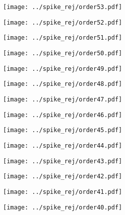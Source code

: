 \documentclass{article}
\begin{document}
\begin{figure}[H]
    \centering
    \texttt{[image: ../spike\_rej/order53.pdf]}
\end{figure}
\begin{figure}[H]
    \centering
    \texttt{[image: ../spike\_rej/order52.pdf]}
\end{figure}
\begin{figure}[H]
    \centering
    \texttt{[image: ../spike\_rej/order51.pdf]}
\end{figure}
\begin{figure}[H]
    \centering
    \texttt{[image: ../spike\_rej/order50.pdf]}
\end{figure}
\begin{figure}[H]
    \centering
    \texttt{[image: ../spike\_rej/order49.pdf]}
\end{figure}
\begin{figure}[H]
    \centering
    \texttt{[image: ../spike\_rej/order48.pdf]}
\end{figure}
\begin{figure}[H]
    \centering
    \texttt{[image: ../spike\_rej/order47.pdf]}
\end{figure}
\begin{figure}[H]
    \centering
    \texttt{[image: ../spike\_rej/order46.pdf]}
\end{figure}
\begin{figure}[H]
    \centering
    \texttt{[image: ../spike\_rej/order45.pdf]}
\end{figure}
\begin{figure}[H]
    \centering
    \texttt{[image: ../spike\_rej/order44.pdf]}
\end{figure}
\begin{figure}[H]
    \centering
    \texttt{[image: ../spike\_rej/order43.pdf]}
\end{figure}
\begin{figure}[H]
    \centering
    \texttt{[image: ../spike\_rej/order42.pdf]}
\end{figure}
\begin{figure}[H]
    \centering
    \texttt{[image: ../spike\_rej/order41.pdf]}
\end{figure}
\begin{figure}[H]
    \centering
    \texttt{[image: ../spike\_rej/order40.pdf]}
\end{figure}
\end{document}
